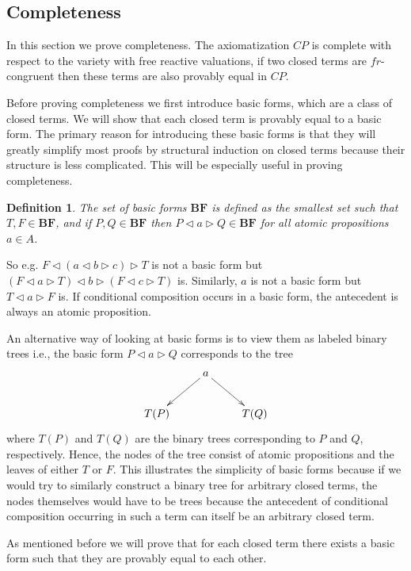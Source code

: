 \documentclass[a4paper,twoside,openright]{report}
\newcommand{\BF}{\ensuremath{\textbf{BF}}}
\newcommand{\lef}{\ensuremath{\triangleleft}}
\newcommand{\rig}{\ensuremath{\triangleright}}
\newtheorem{defn}[theorem]{Definition}
\begin{document}
\subsection{Completeness}
In this section we prove completeness. The axiomatization $CP$ is complete with respect to the variety with free reactive valuations, if two closed terms are $fr$-congruent then these terms are also provably equal in $CP$.

Before proving completeness we first introduce basic forms, which are a class of closed terms. We will show that each closed term is provably equal to a basic form. The primary reason for introducing these basic forms is that they will greatly simplify most proofs by structural induction on closed terms because their structure is less complicated. This will be especially useful in proving completeness.

\begin{defn}\label{basic form def}
The set of basic forms $\BF$ is defined as the smallest set
such that $T,F\in\BF$, and if $P,Q\in\BF$ then $P\lef a\rig Q\in\BF$ for all atomic propositions $a\in A$.
\end{defn}

So e.g. $F\lef(a\lef b\rig c)\rig T$ is not a basic form but $(F\lef a\rig T)\lef b\rig(F\lef c\rig T)$ is. Similarly, $a$ is not a basic form but $T\lef a\rig F$ is. If conditional composition occurs in a basic form, the antecedent is always an atomic proposition.

An alternative way of looking at basic forms is to view them as labeled binary trees i.e., the basic form $P\lef a\rig Q$ corresponds to the tree
\[
\xymatrix{
&a\ar[dl]\ar[dr]\\
T(P)&&T(Q)
}
\]
where $T(P)$ and $T(Q)$ are the binary trees corresponding to $P$ and $Q$, respectively. Hence, the nodes of the tree consist of atomic propositions and the leaves of either $T$ or $F$. This illustrates the simplicity of basic forms because if we would try to similarly construct a binary tree for arbitrary closed terms, the nodes themselves would have to be trees because the antecedent of conditional composition occurring in such a term can itself be an arbitrary closed term.

As mentioned before we will prove that for each closed term there exists a basic form such that they are provably equal to each other.
\end{document}
